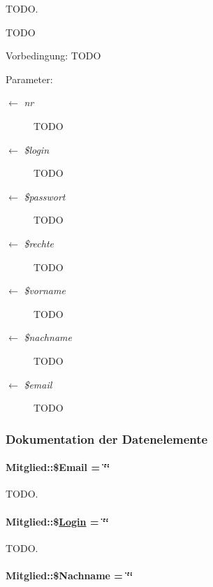 TODO. 

TODO \begin{Desc}
\item[Vorbedingung:]TODO \end{Desc}
\begin{Desc}
\item[Parameter:]
\begin{description}
\item[\mbox{$\leftarrow$} {\em nr}]TODO \item[\mbox{$\leftarrow$} {\em \$login}]TODO \item[\mbox{$\leftarrow$} {\em \$passwort}]TODO \item[\mbox{$\leftarrow$} {\em \$rechte}]TODO \item[\mbox{$\leftarrow$} {\em \$vorname}]TODO \item[\mbox{$\leftarrow$} {\em \$nachname}]TODO \item[\mbox{$\leftarrow$} {\em \$email}]TODO \end{description}
\end{Desc}


\subsubsection{Dokumentation der Datenelemente}
\hypertarget{classMitglied_4be6b837c482ac912188663380d31122}{
\paragraph[\$Email]{\setlength{\rightskip}{0pt plus 5cm}Mitglied::\$Email = \char`\"{}\char`\"{}}\hfill}
\label{classMitglied_4be6b837c482ac912188663380d31122}


TODO. 

\hypertarget{classMitglied_626ee2f2551cc2840bdeac6a04491b2e}{
\paragraph[\$Login]{\setlength{\rightskip}{0pt plus 5cm}Mitglied::\$\hyperlink{classLogin}{Login} = \char`\"{}\char`\"{}}\hfill}
\label{classMitglied_626ee2f2551cc2840bdeac6a04491b2e}


TODO. 

\hypertarget{classMitglied_635def9ec266748689397299c7f79d9c}{
\paragraph[\$Nachname]{\setlength{\rightskip}{0pt plus 5cm}Mitglied::\$Nachname = \char`\"{}\char`\"{}}\hfill}
\label{classMitglied_635def9ec266748689397299c7f79d9c}


